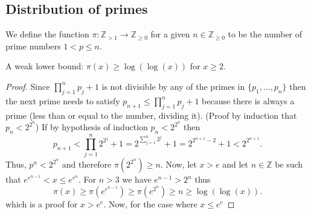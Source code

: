 \subsection{Distribution of primes}

\begin{definition}
   We define the function \(\pi: \mathbb{Z}_{>1} \to
   \mathbb{Z}_{\geqslant 0}\) for a given \(n \in \mathbb{Z}_{\geqslant 0}\) to
   be the number of prime numbers \(1 < p \leqslant n\).
\end{definition}

\begin{theorem}
   A weak lower bound: \(\pi(x) \geqslant \log(\log(x))\) for \(x \geqslant 2\).
\end{theorem}

\begin{proof}
   Since \(\prod_{j=1}^n p_j + 1\) is not divisible by any of the primes in
   \(\{p_1, \dots, p_n\} \) then the next prime needs to satisfy \(p_{n+1}
   \leqslant \prod_{j=1}^n p_j + 1\) because there is always a prime (less than
   or equal to the number, dividing it). (Proof by induction that \(p_n <
   2^{2^n}\)) If by hypothesis of induction \(p_n < 2^{2^n}\) then  
   \[
      p_{n+1} < \prod_{j=1}^n 2^{2^j} + 1 = 2^{\sum_{j=1}^n 2^j} + 1 =
      2^{2^{n+1} - 2}+1 < 2^{2^{n+1}}.
   \]
   Thus, \(p^n < 2^{2^n}\) and therefore \(\pi(2^{2^n}) \geqslant n\). Now, let
   \(x > e\) and let \(n \in \mathbb{Z}\) be such that \(e^{e^{n-1}} < x
   \leqslant e^{e^n}\). For \(n > 3\) we have \(e^{n-1} > 2^n\) thus 
   \[
      \pi(x) \geqslant  \pi(e^{e^{n-1}}) \geqslant  \pi(e^{2^n}) \geqslant n
      \geqslant \log(\log(x)).
   \] 
   which is a proof for \(x > e^e\). Now, for the case where \(x \leqslant e^e\)
   
\end{proof}
